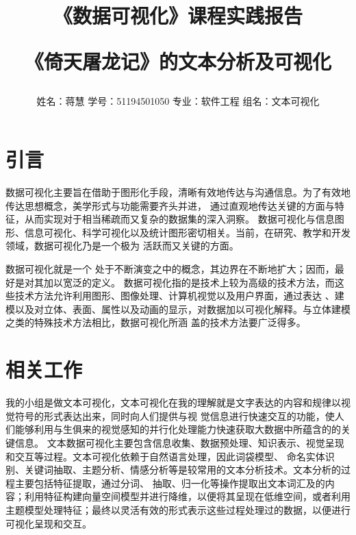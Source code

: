 \documentclass[UTF8]{ctexart}
\begin{document}
	\title{\textbf{《数据可视化》课程实践报告}\\[1ex]
	\begin{large}
		《倚天屠龙记》的文本分析及可视化
		\end{large}}
	\author{姓名：蒋慧\,\,学号：51194501050\,\,专业：软件工程\,\,组名：文本可视化}
	\maketitle

\section{引言}
\par{
	数据可视化主要旨在借助于图形化手段，清晰有效地传达与沟通信息。为了有效地传达思想概念，美学形式与功能需要齐头并进，
	通过直观地传达关键的方面与特征，从而实现对于相当稀疏而又复杂的数据集的深入洞察。
数据可视化与信息图形、信息可视化、科学可视化以及统计图形密切相关。当前，在研究、教学和开发领域，数据可视化乃是一个极为
活跃而又关键的方面。
}
\par{数据可视化就是一个
处于不断演变之中的概念，其边界在不断地扩大；因而，最好是对其加以宽泛的定义。
数据可视化指的是技术上较为高级的技术方法，而这些技术方法允许利用图形、图像处理、计算机视觉以及用户界面，通过表达
、建模以及对立体、表面、属性以及动画的显示，对数据加以可视化解释。与立体建模之类的特殊技术方法相比，数据可视化所涵
盖的技术方法要广泛得多。}
\section{相关工作}
\par{
	我的小组是做文本可视化，文本可视化在我的理解就是文字表达的内容和规律以视觉符号的形式表达出来，同时向人们提供与视
	觉信息进行快速交互的功能，使人们能够利用与生俱来的视觉感知的并行化处理能力快速获取大数据中所蕴含的的关键信息。
	文本数据可视化主要包含信息收集、数据预处理、知识表示、视觉呈现和交互等过程。文本可视化依赖于自然语言处理，因此词袋模型、
	命名实体识别、关键词抽取、主题分析、情感分析等是较常用的文本分析技术。文本分析的过程主要包括特征提取，通过分词、
	抽取、归一化等操作提取出文本词汇及的内容；利用特征构建向量空间模型并进行降维，以便将其呈现在低维空间，或者利用
	主题模型处理特征；最终以灵活有效的形式表示这些过程处理过的数据，以便进行可视化呈现和交互。
}
\end{document}
